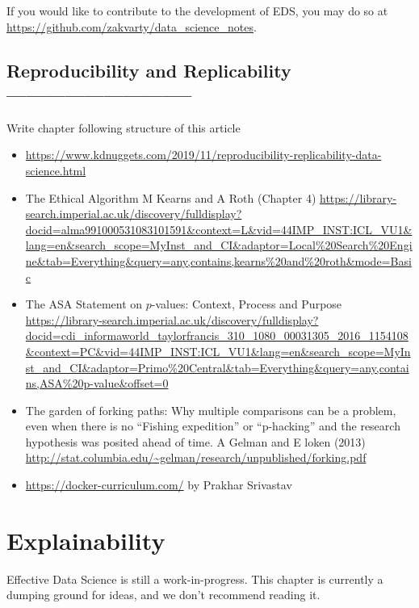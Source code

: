 \documentclass[
  12pt,
]{book}
\begin{document}
If you would like to contribute to the development of EDS, you may do so at \url{https://github.com/zakvarty/data_science_notes}.

\hypertarget{reproducibility-and-replicability}{%
\section{Reproducibility and Replicability -----------------------------}\label{reproducibility-and-replicability}}

Write chapter following structure of this article

\begin{itemize}
\item
  \url{https://www.kdnuggets.com/2019/11/reproducibility-replicability-data-science.html}
\item
  The Ethical Algorithm M Kearns and A Roth (Chapter 4) \url{https://library-search.imperial.ac.uk/discovery/fulldisplay?docid=alma991000531083101591\&context=L\&vid=44IMP_INST:ICL_VU1\&lang=en\&search_scope=MyInst_and_CI\&adaptor=Local\%20Search\%20Engine\&tab=Everything\&query=any,contains,kearns\%20and\%20roth\&mode=Basic}
\item
  The ASA Statement on \(p\)-values: Context, Process and Purpose \url{https://library-search.imperial.ac.uk/discovery/fulldisplay?docid=cdi_informaworld_taylorfrancis_310_1080_00031305_2016_1154108\&context=PC\&vid=44IMP_INST:ICL_VU1\&lang=en\&search_scope=MyInst_and_CI\&adaptor=Primo\%20Central\&tab=Everything\&query=any,contains,ASA\%20p-value\&offset=0}
\item
  The garden of forking paths: Why multiple comparisons can be a problem,
  even when there is no ``Fishing expedition'' or ``p-hacking'' and the research
  hypothesis was posited ahead of time. A Gelman and E loken (2013) \url{http://stat.columbia.edu/~gelman/research/unpublished/forking.pdf}
\item
  \url{https://docker-curriculum.com/} by Prakhar Srivastav
\end{itemize}

\hypertarget{production-explainability}{%
\chapter{Explainability}\label{production-explainability}}

Effective Data Science is still a work-in-progress. This chapter is currently a dumping ground for ideas, and we don't recommend reading it.
\end{document}
